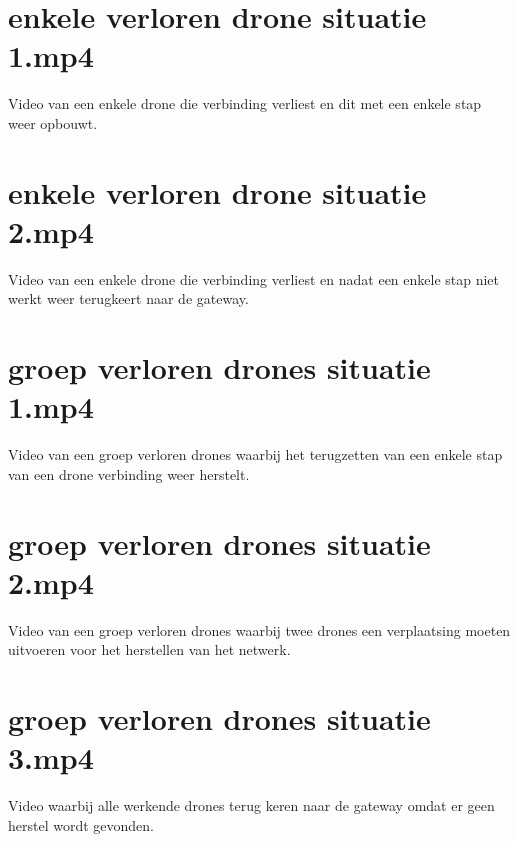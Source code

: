 \documentclass[a4paper, 11pt, oneside]{report}
\begin{document}
\section{enkele verloren drone situatie 1.mp4}\label{sec:enkele-verloren-drone-situatie-1mp4} Video van een enkele drone die verbinding verliest en dit met een enkele stap weer opbouwt.
\section{enkele verloren drone situatie 2.mp4}\label{sec:enkele-verloren-drone-situatie-2mp4} Video van een enkele drone die verbinding verliest en nadat een enkele stap niet werkt weer terugkeert naar de gateway.
\section{groep verloren drones situatie 1.mp4}\label{sec:groep-verloren-drones-situatie-1mp4} Video van een groep verloren drones waarbij het terugzetten van een enkele stap van een drone verbinding weer herstelt.
\section{groep verloren drones situatie 2.mp4}\label{sec:groep-verloren-drones-situatie-2mp4} Video van een groep verloren drones waarbij twee drones een verplaatsing moeten uitvoeren voor het herstellen van het netwerk.
\section{groep verloren drones situatie 3.mp4}\label{sec:groep-verloren-drones-situatie-3mp4} Video waarbij alle werkende drones terug keren naar de gateway omdat er geen herstel wordt gevonden.
\end{document}
